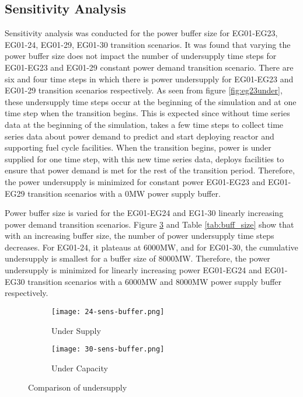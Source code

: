 \subsection{Sensitivity Analysis}
Sensitivity analysis was conducted for the power buffer size for 
EG01-EG23, EG01-24, EG01-29, EG01-30 transition scenarios. 
It was found that varying the power buffer size does not 
impact the number of undersupply time steps for EG01-EG23 
and EG01-29 constant power demand transition scenario. 
There are six and four time steps in which there is power 
undersupply for EG01-EG23 and EG01-29 transition scenarios 
respectively. 
As seen from figure \ref{fig:eg23under}, these undersupply time 
steps occur at the beginning of the simulation and at one 
time step when the transition begins. 
This is expected since without time series data 
at the beginning of the simulation, \deploy takes a few 
time steps to collect time series data about power demand 
to predict and start deploying reactor and supporting 
fuel cycle facilities. 
When the transition begins, power is under supplied for one 
time step, with this new time series data, \deploy deploys 
facilities to ensure that power demand is met for the 
rest of the transition period. 
Therefore, the power undersupply is minimized for constant 
power EG01-EG23 and EG01-EG29 transition scenarios with 
a 0MW power supply buffer. 

Power buffer size is varied for the EG01-EG24 and EG1-30 
linearly increasing power demand transition scenarios. 
Figure \ref{fig:sabuffer} and Table \ref{tab:buff_size} 
show that with an increasing buffer size, the number of 
power undersupply time steps decreases. 
For EG01-24, it plateaus at 6000MW, and for EG01-30, 
the cumulative undersupply is smallest for a buffer 
size of 8000MW.  
Therefore, the power undersupply is minimized for linearly 
increasing power EG01-EG24 and EG01-EG30 transition scenarios with 
a 6000MW and 8000MW power supply buffer respectively. 

\begin{figure}[]
	\centering
	\begin{subfigure}[t]{0.8\textwidth}
		\centering
		\texttt{[image: 24-sens-buffer.png]} 
		\caption{Under Supply}
		\label{fig:23undersupply}
	\end{subfigure}
	\vspace{1cm}
	\begin{subfigure}[t]{0.8\textwidth}
		\centering
		\texttt{[image: 30-sens-buffer.png]} 
		\caption{Under Capacity}
		\label{fig:23undercapacity}
	\end{subfigure}
	\hfill
	\caption{Comparison of undersupply}
	\label{fig:sabuffer}
\end{figure}

